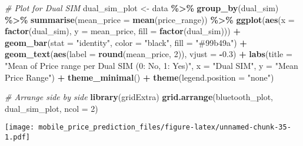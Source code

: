 \documentclass[
]{article}
\newenvironment{Shaded}{\begin{snugshade}}{\end{snugshade}}
\newcommand{\AttributeTok}[1]{\textcolor[rgb]{0.13,0.29,0.53}{#1}}
\newcommand{\CommentTok}[1]{\textcolor[rgb]{0.56,0.35,0.01}{\textit{#1}}}
\newcommand{\DecValTok}[1]{\textcolor[rgb]{0.00,0.00,0.81}{#1}}
\newcommand{\FloatTok}[1]{\textcolor[rgb]{0.00,0.00,0.81}{#1}}
\newcommand{\FunctionTok}[1]{\textcolor[rgb]{0.13,0.29,0.53}{\textbf{#1}}}
\newcommand{\NormalTok}[1]{#1}
\newcommand{\OtherTok}[1]{\textcolor[rgb]{0.56,0.35,0.01}{#1}}
\newcommand{\SpecialCharTok}[1]{\textcolor[rgb]{0.81,0.36,0.00}{\textbf{#1}}}
\newcommand{\StringTok}[1]{\textcolor[rgb]{0.31,0.60,0.02}{#1}}
\begin{document}
\begin{Shaded}
\begin{Highlighting}[]
\CommentTok{\# Plot for Dual SIM}
\NormalTok{dual\_sim\_plot }\OtherTok{\textless{}{-}}\NormalTok{ data }\SpecialCharTok{\%\textgreater{}\%}
  \FunctionTok{group\_by}\NormalTok{(dual\_sim) }\SpecialCharTok{\%\textgreater{}\%}
  \FunctionTok{summarise}\NormalTok{(}\AttributeTok{mean\_price =} \FunctionTok{mean}\NormalTok{(price\_range)) }\SpecialCharTok{\%\textgreater{}\%}
  \FunctionTok{ggplot}\NormalTok{(}\FunctionTok{aes}\NormalTok{(}\AttributeTok{x =} \FunctionTok{factor}\NormalTok{(dual\_sim), }\AttributeTok{y =}\NormalTok{ mean\_price, }\AttributeTok{fill =} \FunctionTok{factor}\NormalTok{(dual\_sim))) }\SpecialCharTok{+}
  \FunctionTok{geom\_bar}\NormalTok{(}\AttributeTok{stat =} \StringTok{"identity"}\NormalTok{, }\AttributeTok{color =} \StringTok{"black"}\NormalTok{, }\AttributeTok{fill =} \StringTok{"\#99b49a"}\NormalTok{) }\SpecialCharTok{+}
  \FunctionTok{geom\_text}\NormalTok{(}\FunctionTok{aes}\NormalTok{(}\AttributeTok{label =} \FunctionTok{round}\NormalTok{(mean\_price, }\DecValTok{2}\NormalTok{)), }\AttributeTok{vjust =} \SpecialCharTok{{-}}\FloatTok{0.3}\NormalTok{) }\SpecialCharTok{+}
  \FunctionTok{labs}\NormalTok{(}\AttributeTok{title =} \StringTok{"Mean of Price range per Dual SIM (0: No, 1: Yes)"}\NormalTok{, }\AttributeTok{x =} \StringTok{"Dual SIM"}\NormalTok{, }\AttributeTok{y =} \StringTok{"Mean Price Range"}\NormalTok{) }\SpecialCharTok{+}
  \FunctionTok{theme\_minimal}\NormalTok{() }\SpecialCharTok{+}
  \FunctionTok{theme}\NormalTok{(}\AttributeTok{legend.position =} \StringTok{"none"}\NormalTok{)}

\CommentTok{\# Arrange side by side}
\FunctionTok{library}\NormalTok{(gridExtra)}
\FunctionTok{grid.arrange}\NormalTok{(bluetooth\_plot, dual\_sim\_plot, }\AttributeTok{ncol =} \DecValTok{2}\NormalTok{)}
\end{Highlighting}
\end{Shaded}

\texttt{[image: mobile\_price\_prediction\_files/figure-latex/unnamed-chunk-35-1.pdf]}
\end{document}

